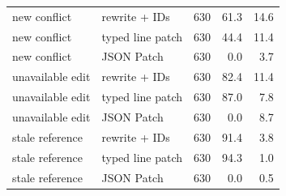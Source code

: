 \begin{tabular}{llrrr}
new conflict & rewrite + IDs & 630 & 61.3 & 14.6 \\
new conflict & typed line patch & 630 & 44.4 & 11.4 \\
new conflict & JSON Patch & 630 & 0.0 & 3.7 \\
unavailable edit & rewrite + IDs & 630 & 82.4 & 11.4 \\
unavailable edit & typed line patch & 630 & 87.0 & 7.8 \\
unavailable edit & JSON Patch & 630 & 0.0 & 8.7 \\
stale reference & rewrite + IDs & 630 & 91.4 & 3.8 \\
stale reference & typed line patch & 630 & 94.3 & 1.0 \\
stale reference & JSON Patch & 630 & 0.0 & 0.5 \\
\bottomrule
\end{tabular}
